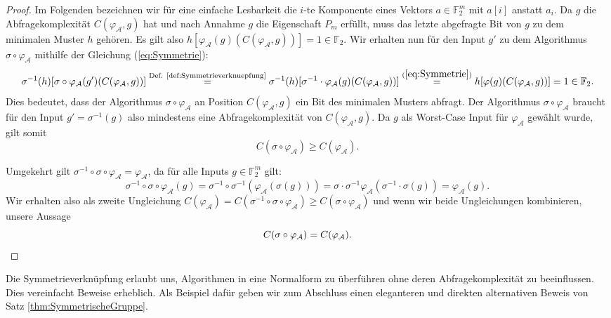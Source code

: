\documentclass[10pt,a4paper, footheight=1mm, bibliography=totoc]{scrreprt}
\theoremstyle{definition}
\begin{document}
\begin{proof}
Im Folgenden bezeichnen wir für eine einfache Lesbarkeit die
$i$-te Komponente eines Vektors $a\in\mathbb{F}_2^m$ mit
$a[i]$ anstatt $a_i$.
Da $g$ die Abfragekomplexität $C(\varphi_\mathcal{A}, g)$
hat und nach Annahme $g$ die Eigenschaft $P_m$ erfüllt,
muss das letzte abgefragte Bit von $g$ zu dem
minimalen Muster $h$ gehören. Es gilt also 
$h[\varphi_\mathcal{A}(g)(C(\varphi_\mathcal{A}, g))]= 1 \in \mathbb{F}_2$.
Wir erhalten nun für den Input $g'$ zu dem
Algorithmus $\sigma \circ \varphi_\mathcal{A}$ mithilfe der 
Gleichung (\ref{eq:Symmetrie}):
$$\sigma^{-1}(h)[\sigma \circ \varphi_\mathcal{A}(g')(C(\varphi_\mathcal{A}, g))]
\overset{\textup{Def. \ref{def:Symmetrieverknuepfung}}}{=}
\sigma^{-1}(h)[\sigma^{-1} \cdot \varphi_\mathcal{A}(g)(C(\varphi_\mathcal{A}, g))]
\overset{(\ref{eq:Symmetrie})}{=}
h[\varphi(g)(C(\varphi_\mathcal{A}, g))]
= 1 \in \mathbb{F}_2.$$
Dies bedeutet, dass der Algorithmus $\sigma \circ \varphi_\mathcal{A}$ an Position
$C(\varphi_\mathcal{A}, g)$ ein Bit des minimalen Musters abfragt.
Der Algorithmus $\sigma \circ \varphi_\mathcal{A}$ braucht für den
Input $g'=\sigma^{-1}(g)$ also mindestens eine Abfragekomplexität
von $C(\varphi_\mathcal{A}, g)$. Da $g$ als Worst-Case Input für
$\varphi_\mathcal{A}$ gewählt wurde, gilt somit
$$ C(\sigma \circ \varphi_\mathcal{A}) \geq C(\varphi_\mathcal{A}).$$

Umgekehrt gilt
$\sigma^{-1}\circ \sigma \circ \varphi_\mathcal{A} = \varphi_\mathcal{A}$,
da für alle Inputs $g\in\mathbb{F}_2^m$ gilt:
$$\sigma^{-1}\circ \sigma \circ \varphi_\mathcal{A}(g)
= \sigma^{-1} \circ \sigma^{-1}(\varphi_\mathcal{A}(\sigma(g)))
= \sigma \cdot \sigma^{-1} \varphi_\mathcal{A}(\sigma^{-1}\cdot \sigma(g))
= \varphi_\mathcal{A}(g).
$$
Wir erhalten also als zweite Ungleichung
$C(\varphi_\mathcal{A}) = C(\sigma^{-1}\circ \sigma \circ \varphi_\mathcal{A})
\geq C(\sigma \circ \varphi_\mathcal{A})$
und wenn wir beide Ungleichungen kombinieren, unsere Aussage
\begin{equation*}
C(\sigma \circ \varphi_\mathcal{A}) = C(\varphi_\mathcal{A}).
\qedhere
\end{equation*}
\end{proof}
Die Symmetrieverknüpfung erlaubt uns, Algorithmen
in eine Normalform zu überführen ohne deren Abfragekomplexität
zu beeinflussen. Dies vereinfacht Beweise erheblich.
Als Beispiel dafür geben wir zum Abschluss einen eleganteren und
direkten alternativen
Beweis von Satz \ref{thm:SymmetrischeGruppe}.
\end{document}
